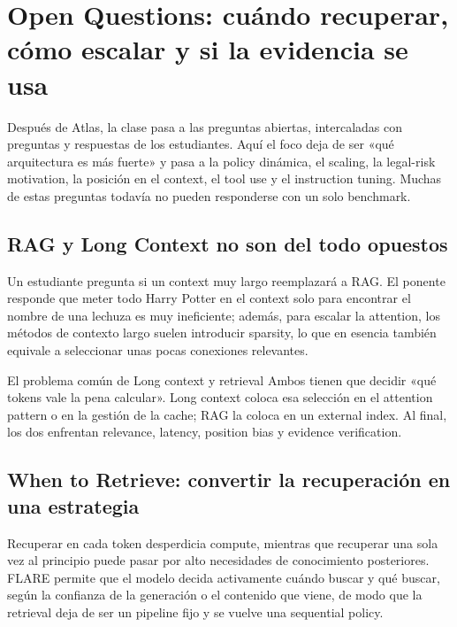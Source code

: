 \section{Open Questions: cuándo recuperar, cómo escalar y si la evidencia se usa}

Después de Atlas, la clase pasa a las preguntas abiertas, intercaladas con preguntas y respuestas de los estudiantes. Aquí el foco deja de ser «qué arquitectura es más fuerte» y pasa a la policy dinámica, el scaling, la legal-risk motivation, la posición en el context, el tool use y el instruction tuning. Muchas de estas preguntas todavía no pueden responderse con un solo benchmark.

\subsection{RAG y Long Context no son del todo opuestos}

Un estudiante pregunta si un context muy largo reemplazará a RAG. El ponente responde que meter todo Harry Potter en el context solo para encontrar el nombre de una lechuza es muy ineficiente; además, para escalar la attention, los métodos de contexto largo suelen introducir sparsity, lo que en esencia también equivale a seleccionar unas pocas conexiones relevantes.

\begin{knowledgebox}{El problema común de Long context y retrieval}
Ambos tienen que decidir «qué tokens vale la pena calcular». Long context coloca esa selección en el attention pattern o en la gestión de la cache; RAG la coloca en un external index. Al final, los dos enfrentan relevance, latency, position bias y evidence verification.
\end{knowledgebox}


\subsection{When to Retrieve: convertir la recuperación en una estrategia}

Recuperar en cada token desperdicia compute, mientras que recuperar una sola vez al principio puede pasar por alto necesidades de conocimiento posteriores. FLARE permite que el modelo decida activamente cuándo buscar y qué buscar, según la confianza de la generación o el contenido que viene, de modo que la retrieval deja de ser un pipeline fijo y se vuelve una sequential policy.

